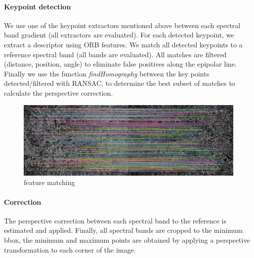 \documentclass[]{elsarticle}
\begin{document}
	\paragraph{Keypoint detection}
	We use one of the keypoint extractors mentioned above between each spectral band gradient (all extractors are evaluated).
	For each detected keypoint, we extract a descriptor using ORB features.
	We match all detected keypoints to a reference spectral band (all bands are evaluated).
	All matches are filtered (distance, position, angle) to eliminate false positives along the epipolar line.
	Finally we use the function \textit{findHomography} between the key points detected/filtered with RANSAC,
	to determine the best subset of matches to calculate the perspective correction.
	
	
	\begin{figure}[!htb]
		\centering
		\includegraphics[width=0.7\linewidth]{../figures/prespective-feature-matching.jpg}
		\caption{feature matching}
		\label{fig:feature-matching}
	\end{figure}
	
	\paragraph{Correction}
	
	The perspective correction between each spectral band to the reference is estimated and applied.
	Finally, all spectral bands are cropped to the minimum bbox,
	the minimum and maximum points are obtained by applying a perspective transformation to each corner of the image.
	
	
\end{document}
